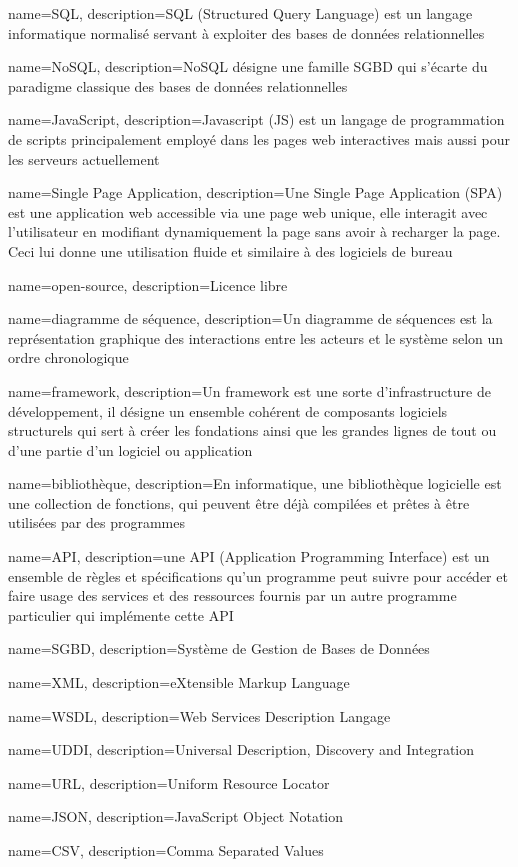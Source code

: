 {
    name=SQL,
    description={SQL (Structured Query Language) est un langage informatique normalisé servant à exploiter des bases de données relationnelles}
}

{
    name=NoSQL,
    description={NoSQL désigne une famille SGBD qui s'écarte du paradigme classique des bases de données relationnelles}
}

{
    name=JavaScript,
    description={Javascript (JS) est un langage de programmation de scripts principalement employé dans les pages web interactives mais aussi pour les serveurs actuellement}
}

{
    name=Single Page Application,
    description={Une Single Page Application (SPA) est une application web accessible via une page web unique, elle interagit avec l'utilisateur en modifiant dynamiquement la page sans avoir à recharger la page. Ceci lui donne une utilisation fluide et similaire à des logiciels de bureau}
}

{
    name=open-source,
    description={Licence libre}
}

{
    name=diagramme de séquence,
    description={Un diagramme de séquences est la représentation graphique des interactions entre les acteurs et le système selon un ordre chronologique}
}

{
    name=framework,
    description={Un framework est une sorte d'infrastructure de développement, il désigne un ensemble cohérent de composants logiciels structurels qui sert à créer les fondations ainsi que les grandes lignes de tout ou d'une partie d'un logiciel ou application}
}

{
    name=bibliothèque,
    description={En informatique, une bibliothèque logicielle est une collection de fonctions, qui peuvent être déjà compilées et prêtes à être utilisées par des programmes}
}

{
    name=API,
    description={une API (Application Programming Interface) est un ensemble de règles et spécifications qu'un programme peut suivre pour accéder et faire usage des services et des ressources fournis par un autre programme particulier qui implémente cette API}
}

{
    name=SGBD,
    description={Système de Gestion de Bases de Données}
}

{
    name={XML},
    description={eXtensible Markup Language}
}

{
    name=WSDL,
    description={Web Services Description Langage}
}

{
    name=UDDI,
    description={Universal Description, Discovery and Integration}
}

{
    name=URL,
    description={Uniform Resource Locator}
}

{
    name=JSON,
    description={JavaScript Object Notation}
}

{
    name=CSV,
    description={Comma Separated Values}
}